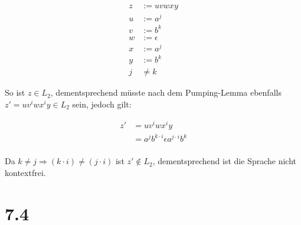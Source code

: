 \documentclass[12pt, a4paper]{article}
\begin{document}
\begin{align*}
z &:= uvwxy \\
u &:= a^j \\
v &:= b^k \\
w &:= \epsilon \\
x &:= a^j \\
y &:= b^k \\
j &\neq k 
\end{align*}

So ist $z \in L_2$, dementsprechend müsste nach dem Pumping-Lemma ebenfalls $z' = u v^i w x^i y \in L_2$ sein, jedoch gilt:

\begin{align*}
z' &= u v^i w x^i y \\
&= a^j b^{k \cdot i} \epsilon a^{j \cdot i} b^k \\
\end{align*}

Da  $k \neq j \Rightarrow (k \cdot i) \neq (j \cdot i)$ ist $z' \notin L_2$, dementsprechend ist die Sprache nicht kontextfrei.
\section*{7.4}
\end{document}
